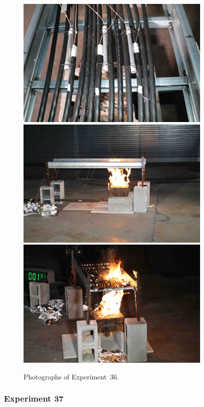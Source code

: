 \begin{figure}[p]
\centering
\includegraphics[height=2.50in]{../FIGURES/Test_36_setup} \\
\includegraphics[height=2.50in]{../FIGURES/Test_36_side} \\
\includegraphics[height=2.50in]{../FIGURES/Test_36_1_min_31_s}
\caption[Photographs of Experiment~36]{Photographs of Experiment~36.}
\label{fig:Test_36_photos}
\end{figure}


\clearpage

\subsubsection{Experiment 37}

